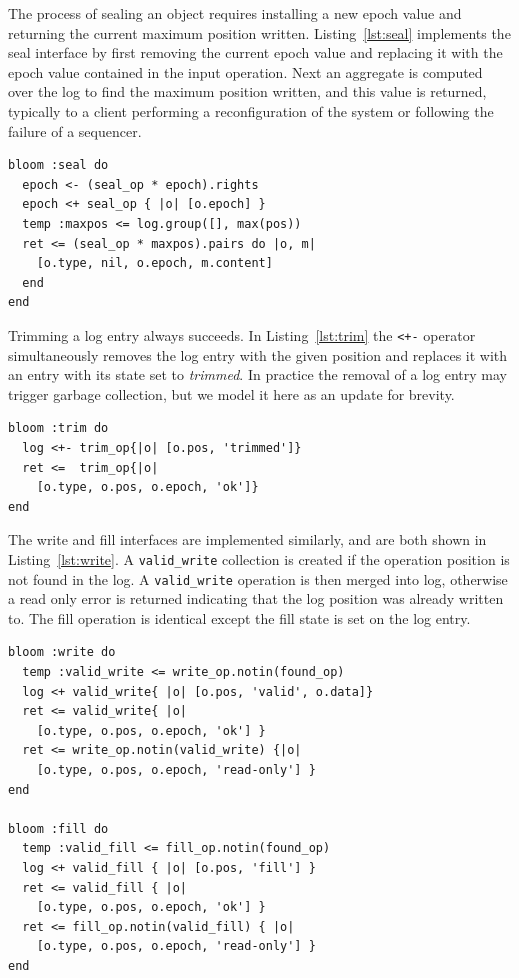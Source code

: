 \documentclass[10pt,twocolumn]{article}
\begin{document}
The process of sealing an object requires installing a new epoch value and
returning the current maximum position written. Listing~\ref{lst:seal}
implements the seal interface by first removing the current epoch value and
replacing it with the epoch value contained in the input operation. Next an
aggregate is computed over the log to find the maximum position written, and
this value is returned, typically to a client performing a reconfiguration of
the system or following the failure of a sequencer.

\begin{lstlisting}[caption={Seal}, label=lst:seal]
bloom :seal do
  epoch <- (seal_op * epoch).rights
  epoch <+ seal_op { |o| [o.epoch] }
  temp :maxpos <= log.group([], max(pos))
  ret <= (seal_op * maxpos).pairs do |o, m|
    [o.type, nil, o.epoch, m.content]
  end
end
\end{lstlisting}

Trimming a log entry always succeeds. In Listing~\ref{lst:trim} the
\texttt{<+-} operator simultaneously removes the log entry with the given 
position and replaces it with an entry with its state set to \emph{trimmed}.
In practice the removal of a log entry may trigger garbage collection, but
we model it here as an update for brevity.

\begin{lstlisting}[caption={Trim}, label=lst:trim]
bloom :trim do
  log <+- trim_op{|o| [o.pos, 'trimmed']}
  ret <=  trim_op{|o|
    [o.type, o.pos, o.epoch, 'ok']}
end
\end{lstlisting}

The write and fill interfaces are implemented similarly, and are both shown in
Listing~\ref{lst:write}.  A \texttt{valid\_write} collection is created if the
operation position is not found in the log.  A \texttt{valid\_write} operation
is then merged into log, otherwise a read only error is returned indicating
that the log position was already written to.  The fill operation is identical
except the fill state is set on the log entry.

\begin{lstlisting}[caption={Write and Fill}, label=lst:write]
bloom :write do
  temp :valid_write <= write_op.notin(found_op)
  log <+ valid_write{ |o| [o.pos, 'valid', o.data]}
  ret <= valid_write{ |o|
    [o.type, o.pos, o.epoch, 'ok'] }
  ret <= write_op.notin(valid_write) {|o|
    [o.type, o.pos, o.epoch, 'read-only'] }
end

bloom :fill do
  temp :valid_fill <= fill_op.notin(found_op)
  log <+ valid_fill { |o| [o.pos, 'fill'] }
  ret <= valid_fill { |o|
    [o.type, o.pos, o.epoch, 'ok'] }
  ret <= fill_op.notin(valid_fill) { |o|
    [o.type, o.pos, o.epoch, 'read-only'] }
end
\end{lstlisting}
\end{document}
